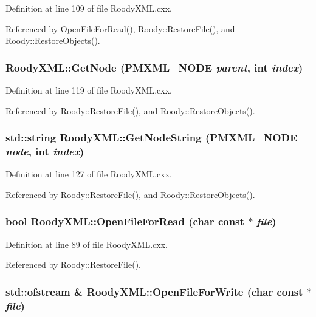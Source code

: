 Definition at line 109 of file RoodyXML.cxx.

Referenced by OpenFileForRead(), Roody::RestoreFile(), and Roody::RestoreObjects().
\subsubsection[{GetNode}]{ RoodyXML::GetNode ({\bf PMXML\_\-NODE} {\em parent}, \/  int {\em index})}\label{classRoodyXML_abd52b4329c95d88afdfe945ae7477a4b}


Definition at line 119 of file RoodyXML.cxx.

Referenced by Roody::RestoreFile(), and Roody::RestoreObjects().
\subsubsection[{GetNodeString}]{\setlength{\rightskip}{0pt plus 5cm}std::string RoodyXML::GetNodeString ({\bf PMXML\_\-NODE} {\em node}, \/  int {\em index})}\label{classRoodyXML_afa9560aa129f731d69bbb521eabbfcd3}


Definition at line 127 of file RoodyXML.cxx.

Referenced by Roody::RestoreFile(), and Roody::RestoreObjects().
\subsubsection[{OpenFileForRead}]{\setlength{\rightskip}{0pt plus 5cm}bool RoodyXML::OpenFileForRead (char const $\ast$ {\em file})}\label{classRoodyXML_ae2dc6ad08072443030eb6fca0f7c75b1}


Definition at line 89 of file RoodyXML.cxx.

Referenced by Roody::RestoreFile().
\subsubsection[{OpenFileForWrite}]{\setlength{\rightskip}{0pt plus 5cm}std::ofstream \& RoodyXML::OpenFileForWrite (char const $\ast$ {\em file})}\label{classRoodyXML_a27c6ad820f177432af7361a7815ca34e}


